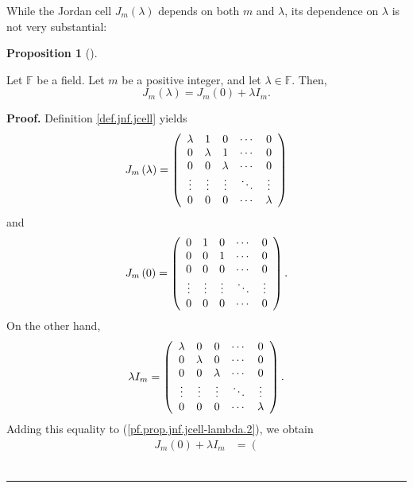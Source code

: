 \documentclass[numbers=enddot,12pt,final,onecolumn,notitlepage]{scrartcl}%
\numberwithin{exer}{subsection}
\theoremstyle{definition}
\newtheorem{prop}[theo]{Proposition}
\newenvironment{proposition}[1][]
{\begin{prop}[#1]\begin{leftbar}}
{\end{leftbar}\end{prop}}
\newenvironment{proof}[1][Proof]{\noindent\textbf{#1.} }{\ \rule{0.5em}{0.5em}}
\begin{document}
While the Jordan cell $J_{m}\left(  \lambda\right)  $ depends on both $m$ and
$\lambda$, its dependence on $\lambda$ is not very substantial:

\begin{proposition}
\label{prop.jnf.jcell-lambda}Let $\mathbb{F}$ be a field. Let $m$ be a
positive integer, and let $\lambda\in\mathbb{F}$. Then,%
\[
J_{m}\left(  \lambda\right)  =J_{m}\left(  0\right)  +\lambda I_{m}.
\]

\end{proposition}

\begin{proof}
Definition \ref{def.jnf.jcell} yields%
\begin{equation}
J_{m}\left(  \lambda\right)  =\left(
\begin{array}
[c]{ccccc}%
\lambda & 1 & 0 & \cdots & 0\\
0 & \lambda & 1 & \cdots & 0\\
0 & 0 & \lambda & \cdots & 0\\
\vdots & \vdots & \vdots & \ddots & \vdots\\
0 & 0 & 0 & \cdots & \lambda
\end{array}
\right)  \label{pf.prop.jnf.jcell-lambda.1}%
\end{equation}
and%
\begin{equation}
J_{m}\left(  0\right)  =\left(
\begin{array}
[c]{ccccc}%
0 & 1 & 0 & \cdots & 0\\
0 & 0 & 1 & \cdots & 0\\
0 & 0 & 0 & \cdots & 0\\
\vdots & \vdots & \vdots & \ddots & \vdots\\
0 & 0 & 0 & \cdots & 0
\end{array}
\right)  . \label{pf.prop.jnf.jcell-lambda.2}%
\end{equation}
On the other hand,%
\[
\lambda I_{m}=\left(
\begin{array}
[c]{ccccc}%
\lambda & 0 & 0 & \cdots & 0\\
0 & \lambda & 0 & \cdots & 0\\
0 & 0 & \lambda & \cdots & 0\\
\vdots & \vdots & \vdots & \ddots & \vdots\\
0 & 0 & 0 & \cdots & \lambda
\end{array}
\right)  .
\]
Adding this equality to (\ref{pf.prop.jnf.jcell-lambda.2}), we obtain%
\begin{align*}
J_{m}\left(  0\right)  +\lambda I_{m}  &  =\left(

\end{align*}
\end{proof}
\end{document}
